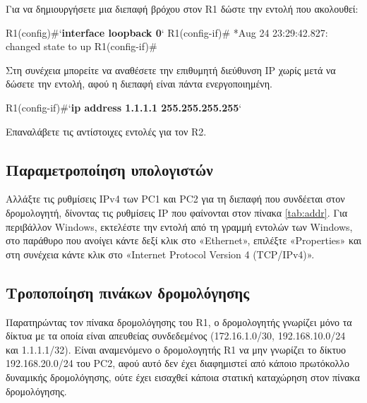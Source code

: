 \documentclass{EdipyLabs} %
\begin{document}
Για να δημιουργήσετε μια διεπαφή βρόχου στον R1 δώστε την εντολή που ακολουθεί:

\begin{CommandBox}
R1(config)#`\textbf{interface loopback 0}`
R1(config-if)#
*Aug 24 23:29:42.827: %
changed state to up
R1(config-if)#
\end{CommandBox}

Στη συνέχεια μπορείτε να αναθέσετε την επιθυμητή διεύθυνση IP χωρίς μετά να δώσετε την εντολή, αφού η διεπαφή είναι πάντα ενεργοποιημένη.

\begin{CommandBox}
R1(config-if)#`\textbf{ip address 1.1.1.1 255.255.255.255}`
\end{CommandBox}

\begin{givecommandbox}
	Επαναλάβετε τις αντίστοιχες εντολές για τον R2.
\end{givecommandbox}

\subsection{Παραμετροποίηση υπολογιστών}
Αλλάξτε τις ρυθμίσεις IPv4 των PC1 και PC2 για τη διεπαφή που συνδέεται στον δρομολογητή, δίνοντας τις ρυθμίσεις IP που φαίνονται στον πίνακα \ref{tab:addr}. Για περιβάλλον Windows, εκτελέστε την εντολή  από τη γραμμή εντολών των Windows, στο παράθυρο που ανοίγει κάντε δεξί κλικ στο «Ethernet», επιλέξτε «Properties» και στη συνέχεια κάντε κλικ στο «Internet Protocol Version 4 (TCP/IPv4)».


\subsection{Τροποποίηση πινάκων δρομολόγησης}

Παρατηρώντας τον πίνακα δρομολόγησης του R1, ο δρομολογητής γνωρίζει μόνο τα δίκτυα με τα οποία είναι απευθείας συνδεδεμένος (172.16.1.0/30, 192.168.10.0/24 και 1.1.1.1/32). Είναι αναμενόμενο ο δρομολογητής R1 να μην γνωρίζει το δίκτυο 192.168.20.0/24 του PC2, αφού αυτό δεν έχει διαφημιστεί από κάποιο πρωτόκολλο δυναμικής δρομολόγησης, ούτε έχει εισαχθεί κάποια στατική καταχώρηση στον πίνακα δρομολόγησης.
\end{document}
